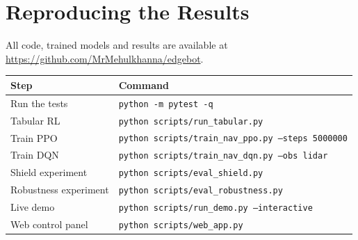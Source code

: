 \documentclass[12pt,a4paper,oneside]{report}
\begin{document}
\chapter{Reproducing the Results}
\label{app:repro}
All code, trained models and results are available at \url{https://github.com/MrMehulkhanna/edgebot}.
\begin{center}
\small
\begin{tabular}{ll}
\toprule
Step & Command \\
\midrule
Run the tests & \texttt{python -m pytest -q} \\
Tabular RL & \texttt{python scripts/run\_tabular.py} \\
Train PPO & \texttt{python scripts/train\_nav\_ppo.py --steps 5000000} \\
Train DQN & \texttt{python scripts/train\_nav\_dqn.py --obs lidar} \\
Shield experiment & \texttt{python scripts/eval\_shield.py} \\
Robustness experiment & \texttt{python scripts/eval\_robustness.py} \\
Live demo & \texttt{python scripts/run\_demo.py --interactive} \\
Web control panel & \texttt{python scripts/web\_app.py} \\
\bottomrule
\end{tabular}
\end{center}
\end{document}
